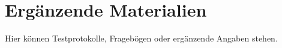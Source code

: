 \chapter{Ergänzende Materialien}
Hier können Testprotokolle, Fragebögen oder ergänzende Angaben stehen.
